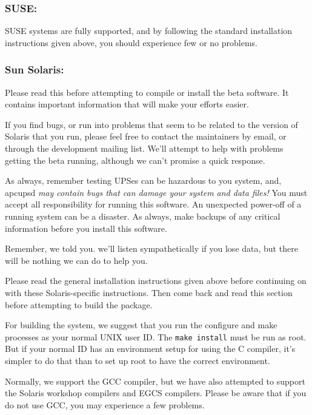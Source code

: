 \label{SUSE}

\subsubsection*{SUSE:}

\label{index-SuSE-48}
\label{index-OS_002c-SuSE-49}
SUSE systems are fully supported, and by following the standard installation
instructions given above, you should experience few or no problems. 

\label{Sun-Solaris}

\subsubsection*{Sun Solaris:}

\label{index-Sun-50}
\label{index-Solaris-51}
\label{index-OS_002c-Solaris-52}
Please read this before attempting to compile or install the beta software. It
contains important information that will make your efforts easier.  

If you find bugs, or run into problems that seem to be related to the version
of Solaris that you run, please feel free to contact the maintainers by email,
or through the development mailing list. We'll attempt to help with problems
getting the beta running, although we can't promise a quick response.  

As always, remember testing UPSes can be hazardous to you system, and, apcupsd
{\it may contain bugs that can damage your system and data files!} You must
accept all responsibility for running this software. An unexpected power-off
of a running system can be a disaster. As always, make backups of any critical
information before you install this software.  

Remember, we told you. we'll listen sympathetically if you lose data, but
there will be nothing we can do to help you.  

Please read the general installation instructions given above before
continuing on with these Solaris-specific instructions. Then come back and
read this section before attempting to build the package.  

For building the system, we suggest that you run the configure and make
processes as your normal UNIX user ID. The {\tt make install} must be run as
root. But if your normal ID has an environment setup for using the C compiler,
it's simpler to do that than to set up root to have the correct environment.  

Normally, we support the GCC compiler, but we have also attempted to support
the Solaris workshop compilers and EGCS compilers. Please be aware that if you
do not use GCC, you may experience a few problems.  

